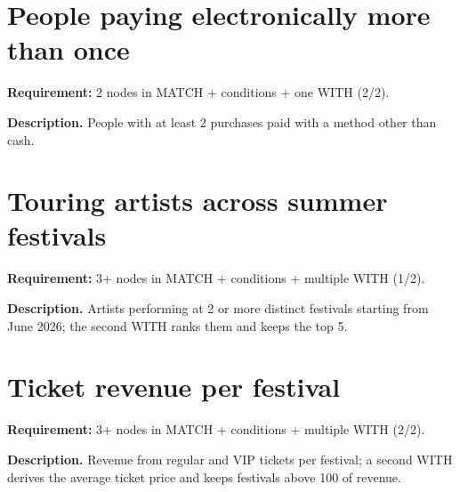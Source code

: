

\section{People paying electronically more than once}
\textbf{Requirement:} 2 nodes in MATCH + conditions + one WITH (2/2).

\textbf{Description.} People with at least 2 purchases paid with a method other than cash. 



\section{Touring artists across summer festivals}
\textbf{Requirement:} 3+ nodes in MATCH + conditions + multiple WITH (1/2).

\textbf{Description.} Artists performing at 2 or more distinct festivals starting from June 2026; the second WITH ranks them and keeps the top 5. 



\section{Ticket revenue per festival}
\textbf{Requirement:} 3+ nodes in MATCH + conditions + multiple WITH (2/2).

\textbf{Description.} Revenue from regular and VIP tickets per festival; a second WITH derives the average ticket price and keeps festivals above 100 of revenue. 



